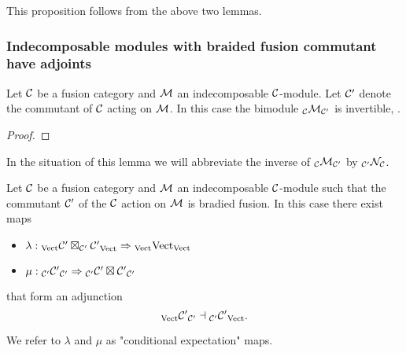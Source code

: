 \documentclass{amsart}
\begin{document}
This proposition follows from the above two lemmas.


\subsubsection{Indecomposable modules with braided fusion commutant have adjoints} \label{sec-df-modules}


\begin{lemma} \label{lemma-invertible}
Let $\mathcal C$ be a fusion category and $\mathcal M$ an indecomposable $\mathcal C$-module.  Let $\mathcal C'$ denote the commutant of $\mathcal C$ acting on $\mathcal M$.  In this case the bimodule ${}_{\mathcal C} {\mathcal M}_{\mathcal C'}$ is invertible, .
\end{lemma}

\begin{proof}


\end{proof}

In the situation of this lemma we will abbreviate the inverse  of ${}_{\mathcal C} {\mathcal M}_{\mathcal C'}$ by ${}_{\mathcal C'} {\mathcal N}_{\mathcal C}$.

\begin{lemma} \label{lemma-conditional}
Let $\mathcal C$ be a fusion category and $\mathcal M$ an indecomposable $\mathcal C$-module such that the commutant $\mathcal C'$ of the $\mathcal C$ action on $\mathcal M$ is bradied fusion.  In this case there exist maps
\begin{itemize}
\item[] $\lambda : {}_{\mathrm{Vect}} {\mathcal C' \boxtimes_{\mathcal C'} \mathcal C'}_{\mathrm{Vect}} \Rightarrow {}_{\mathrm{Vect}} {\mathrm{Vect}}_{\mathrm{Vect}}$
\item[] $\mu : {}_{\mathcal C'} {\mathcal C'}_{\mathcal C'} \Rightarrow {}_{\mathcal C'} {\mathcal C' \boxtimes \mathcal C'}_{\mathcal C'}$
\end{itemize}
that form an adjunction
$${}_{\mathrm{Vect}} {\mathcal C'}_{\mathcal C'} \dashv {}_{\mathcal C'} {\mathcal C'}_{\mathrm{Vect}}.$$
\end{lemma}
\nid We refer to $\lambda$ and $\mu$ as "conditional expectation" maps.
\end{document}
